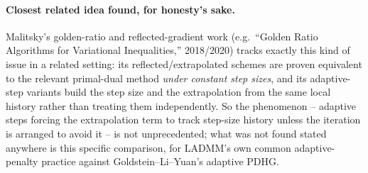 \documentclass[11pt]{article}
\begin{document}
\paragraph{Closest related idea found, for honesty's sake.} Malitsky's
golden-ratio and reflected-gradient work (e.g.\ ``Golden Ratio Algorithms for Variational
Inequalities,'' 2018/2020) tracks exactly this kind of issue in a related setting:
its reflected/extrapolated schemes are proven equivalent to the relevant
primal-dual method \emph{under constant step sizes}, and its adaptive-step variants
build the step size and the extrapolation from the same local history rather than
treating them independently. So the phenomenon -- adaptive steps forcing the
extrapolation term to track step-size history unless the iteration is arranged to
avoid it -- is not unprecedented; what was not found stated anywhere is this
specific comparison, for LADMM's own common adaptive-penalty practice against
Goldstein--Li--Yuan's adaptive PDHG.
\end{document}
